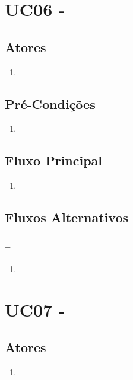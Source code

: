\section{UC06 -}


\subsection{Atores}

\begin{enumerate}
  \item
\end{enumerate}

\subsection{Pré-Condições}
\begin{enumerate}
  \item
\end{enumerate}

\subsection{Fluxo Principal}
\begin{enumerate}
  \item
\end{enumerate}

\subsection{Fluxos Alternativos}

\subsubsection{--}

\begin{enumerate}
  \item
\end{enumerate}

\section{UC07 -}


\subsection{Atores}

\begin{enumerate}
  \item
\end{enumerate}

